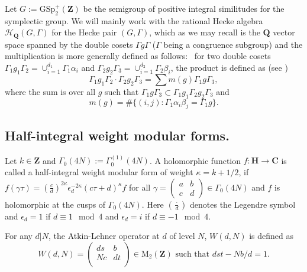 \documentclass[11pt]{amsart}
\numberwithin{equation}{section}
\theoremstyle{plain}
\theoremstyle{definition}
\newcommand*{\Q}{\mathbf{Q}}
\newcommand{\z}{\mf Z}
\newcommand{\mf}{\mathbf}
\newcommand{\mrm}{\mathrm}
\newcommand{\smat}[4]{\left( \begin{smallmatrix}#1&#2\\#3&#4\end{smallmatrix}\right)}
\newcommand{\pmat}[4]{\begin{pmatrix} #1 & #2 \\ #3 & #4 \\ \end{pmatrix} }
\begin{document}
Let $G:= \mrm{GSp}_2^{+}(\z)$ be the semigroup of positive integral similitudes for the symplectic group. We will mainly work with the rational Hecke algebra $\mathscr H_\Q(G, \Gamma)$ for the Hecke pair $(G,\Gamma)$, which as we may recall is the $\Q$ vector space spanned by the double cosets $\Gamma g \Gamma$ ($\Gamma$ being a congruence subgroup) and the multiplication is more generally defined as follows: \, 
for two double cosets $\Gamma_1 g_1\Gamma_2=\cup_{i=1}^{d_1} \Gamma_1 \alpha_i $ and $\Gamma_2 g_2\Gamma_3=\cup_{i=1}^{d_2} \Gamma_2 \beta_i $, the product is defined as (see \cite[Chap.~3]{shimura-aut})
\begin{equation}\label{DCMul}
    \Gamma_1 g_1\Gamma_2\cdot \Gamma_2 g_2\Gamma_3 = \sum m(g) \Gamma_1 g \Gamma_3, 
\end{equation}
where the sum is over all $g$ such that $\Gamma_1g\Gamma_3\subset \Gamma_1g_1\Gamma_2g_2\Gamma_3$ and 
\begin{equation}
    m(g)= \#\{(i,j) : \Gamma_1 \alpha_i\beta_j= \Gamma_1g \}.
\end{equation}
\subsection{Half-integral weight modular forms.}
 Let $k\in \mf Z$ and $\Gamma_0(4N):=\Gamma_0^{(1)}(4N)$. A holomorphic function $f:\mf H\rightarrow \mf C$ is called a half-integral weight modular form of weight $\kappa=k+1/2$, if $f(\gamma\tau)= \left(\frac{c}{d}\right)^{2\kappa} \epsilon_d^{-2\kappa}(c\tau+d)^\kappa f$ for all $\gamma=\smat{a}{b}{c}{d}\in\Gamma_0(4N)$ and $f$ is holomorphic at the cusps of $\Gamma_0(4N)$. Here $\left(\frac{\cdot}{d}\right)$ denotes the Legendre symbol and $\epsilon_d= 1$ if $d\equiv 1\mod 4$ and $\epsilon_d=i$ if $d\equiv -1\mod 4$.

 For any $d|N$, the Atkin-Lehner operator at $d$ of level $N$, $W(d,N)$ is defined as 
\begin{equation}
    W(d,N)=\pmat{ds}{b}{Nc}{dt}\in \mrm{M}_2(\mf Z) \text{ such that } dst-Nb/d=1.
\end{equation}

\end{document}

